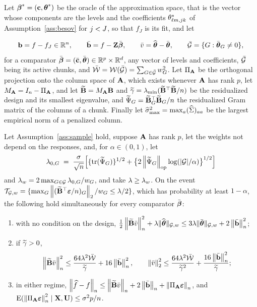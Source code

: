 Let $\betastar = (\bc,\thetastar)$ be the oracle of the approximation space, that is the vector
whose components are the levels and the coefficients
$\coefs{\cv}{\md}{\lev}{\tsl}$ of Assumption~\ref{ass:besov} for $\lev < J$,
so that $f_J$ is its fit, and let


\[
  \bb = f - f_J \in \R^{n},
  \qquad
  \bbar = f - \bZ\bar\bbeta, \qquad \vbar = \thetahat - \thbar ,
  \qquad \Gbar = \{G : \thbar_{G} \ne 0\},
\]
for a comparator $\bar\bbeta = (\bar\bc,\thbar) \in \R^{p}\times\R^{d}$, any
vector of levels and coefficients, $\Gbar$ being its active chunks, and
$\bar\Wcal = \Wcal(\Gbar) = \sum_{G\in\Gbar}w_{G}^{2}$.
Let $\PA$ be the orthogonal projection onto the column space of $\Amat$, which
exists whenever $\Amat$ has rank $p$, let $\MA = I_n - \PA$, and let
$\Btil = \MA\Bmat$ and $\gtil = \lmin(\Btil\T\Btil/n)$ be the residualized
design and its smallest eigenvalue, and
$\Psitil_{G} = \Btil_{G}\T\Btil_{G}/n$ the residualized Gram matrix of the
columns of a chunk. Finally let
$\smax^{2} = \max_a (\Gramhat)_{aa}$ be the largest empirical norm of a
penalized column.



\begin{theorem}
\label{thm:oracle}
Let Assumption~\ref{ass:sample} hold, suppose $\Amat$ has rank $p$, let the
weights not depend on the responses, and, for $\alpha \in (0,1)$, let
\[
  \lamz{G} \;=\; \frac{\sigma}{\sqrt{n}}\Bigl[
  \{\mathrm{tr}(\Psitil_{G})\}^{1/2}
  + \bigl\{2\opnorm{\Psitil_{G}}\log(|\Gcal|/\alpha)\bigr\}^{1/2}\Bigr]
\]
and $\pen_{w} = 2\max_{G\in\Gcal}\lamz{G}/w_{G}$, and take $\pen \ge \pen_{w}$. On the event
$\Tw = \{\max_{G}\norm{(\Btil\T\bveps/n)_{G}}_{2}/w_{G} \le \pen/2\}$, which
has probability at least $1 - \alpha$, the following hold simultaneously for
every comparator $\bar\bbeta$:
\begin{enumerate}
\item[(i)] with no condition on the design,
$\tfrac12\normn{\Btil\vbar}^{2} + \pen\nGw{\thetahat} \le
3\pen\nGw{\thbar} + 2\normn{\bbar}^{2}$;
\item[(ii)] if $\gtil > 0$,
\[
  \normn{\Btil\vbar}^{2} \le \frac{64\pen^{2}\bar\Wcal}{\gtil} + 16\normn{\bbar}^{2},
  \qquad
  \norm{\vbar}_{2}^{2} \le \frac{64\pen^{2}\bar\Wcal}{\gtil^{2}}
  + \frac{16\normn{\bbar}^{2}}{\gtil} ;
\]
\item[(iii)] in either regime,
$\normn{\widehat{f}-f} \le \normn{\Btil\vbar} + 2\normn{\bbar}
+ \normn{\PA\bveps}$, and
$\E(\normn{\PA\bveps}^{2}\mid\bX,\bU) \le \sigma^{2}p/n$.
\end{enumerate}
\end{theorem}


